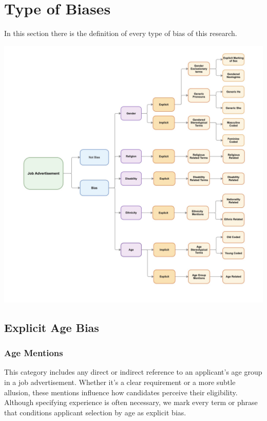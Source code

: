 \documentclass[
]{book}
\begin{document}
\chapter{Type of Biases}\label{type-of-biases}

In this section there is the definition of every type of bias of this research.

\includegraphics{images/Taxonomy-v9.jpg}

\section{Explicit Age Bias}\label{explicit-age-bias}

\subsection*{Age Mentions}\label{age-explicit-bias}

This category includes any direct or indirect reference to an applicant's age group in a job advertisement. Whether it's a clear requirement or a more subtle allusion, these mentions influence how candidates perceive their eligibility. Although specifying experience is often necessary, we mark every term or phrase that conditions applicant selection by age as explicit bias.
\end{document}
